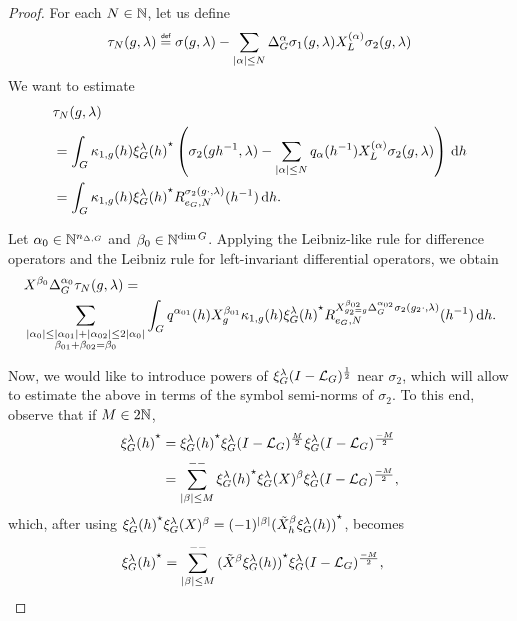 \begin{proof}
    For each $N \in \mathbb{N}$,
    let us define
    \begin{align*}
        \tau_N(g, \lambda) \defeq
        \sigma(g, \lambda) - \sum_{\abs \alpha \leq N} \DifferenceOperatorOrder \alpha \sigma_1(g, \lambda) \TaylorLeftDifferentialOperator \alpha \sigma_2(g, \lambda)
    \end{align*}
    We want to estimate
    \begin{align}
        &\tau_N(g, \lambda) \notag\\
        &= \int_G \kappa_{1, g}(h) {\xi^{\lambda}_{G}(h)}^\star
        \left(\sigma_2(g h^{-1}, \lambda) - \sum_{\left|{\alpha}\right| \leq N} q_\alpha(h^{-1}) X^{(\alpha)}_L \sigma_2(g, \lambda)\right) \,\mathrm{d} h \notag\\
        &= \int_G \kappa_{1, g}(h) {\xi^{\lambda}_{G}(h)}^\star R^{\sigma_2(g \cdot, \lambda)}_{e_G, N} (h^{-1}) \,\mathrm{d} h.
        \label{eq:remainder_of_composition_formula}
    \end{align}

    Let $\alpha_0 \in \mathbb{N}^{n_{\Delta, G}}$ and $\beta_0 \in \mathbb{N}^{\dim G}$.
    Applying the Leibniz-like rule for difference operators
    and the Leibniz rule for left-invariant differential operators,
    we obtain
    \begin{align*}
        &\LeftDifferentialOperator {\beta_0} \DifferenceOperatorOrder {\alpha_0} \tau_N(g, \lambda) =\\
        &\sum_{%
            \substack{%
                \abs{\alpha_0} \leq \abs{\alpha_{01}} + \abs{\alpha_{02}} \leq 2 \abs{\alpha_0}\\
                \beta_{01} + \beta_{02} = \beta_0
            }
        }
        \int_\Group q^{\alpha_{01}}(h) \LeftDifferentialOperator [g] {\beta_{01}} \kappa_{1, g}(h) \adj{\Rep \lambda(h)}
        \TaylorRemainder {\LeftDifferentialOperator [g_2 = g] {\beta_{02}} \DifferenceOperatorOrder {\alpha_{02}} \sigma_2(g_2 \dummy, \lambda)} {e_\Group} N (h^{-1}) \dd h.
    \end{align*}

    Now, we would like to introduce powers of $\xi^{\lambda}_{G} (I - {\mathcal{L}_{G}})^\frac{1}{2}$ near $\sigma_2$,
    which will allow to estimate the above in terms of the symbol semi-norms of $\sigma_2$.
    To this end,
    observe that if $M \in 2 \mathbb{N}$,
    \begin{align*}
        {\xi^{\lambda}_{G}(h)}^\star
        &= {\xi^{\lambda}_{G}(h)}^\star \xi^{\lambda}_{G} (I - {\mathcal{L}_{G}})^\frac{M}{2} \xi^{\lambda}_{G} (I - {\mathcal{L}_{G}})^\frac{-M}{2}\\
        &= \sum_{\left|{\beta}\right| \leq M}^{--} {\xi^{\lambda}_{G}(h)}^\star \xi^{\lambda}_{G}(X)^\beta \xi^{\lambda}_{G} (I - {\mathcal{L}_{G}})^\frac{-M}{2},
    \end{align*}
    which, after using $\adj {\Rep \lambda(h)} \Rep \lambda (X)^\beta = (-1)^{\abs \beta} \adj {(\RightDifferentialOperator[h] \beta \Rep \lambda (h))}$, becomes
    \begin{align*}
        \adj{\Rep \lambda(h)}
        &= \lcsum{\abs \beta \leq M} \adj{(\RightDifferentialOperator \beta \Rep \lambda(h))} \Rep \lambda \BesselPotential {-M},
    \end{align*}


\end{proof}
